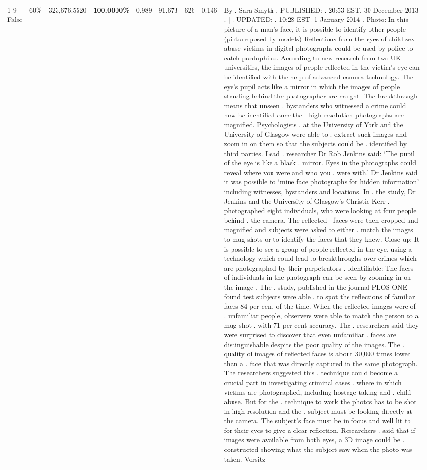 \begin{table}[H]
\begin{tabular}{lllrlllll}
\cline{1-9} \cline{2-9}
False & 60\% & 323,676.5520 & \bfseries \color{red} 100.0000\% & 0.989 & 91.673 & 626 & 0.146 & By . Sara Smyth . PUBLISHED: . 20:53 EST, 30 December 2013 . | . UPDATED: . 10:28 EST, 1 January 2014 . Photo: In this picture of a man's face, it is possible to identify other people (picture posed by models) Reflections from the eyes of child sex abuse victims in digital photographs could be used by police to catch paedophiles. According to new research from two UK universities, the images of people reflected in the victim's eye can be identified with the help of advanced camera technology. The eye's pupil acts like a mirror in which the images of people standing behind the photographer are caught. The breakthrough means that unseen . bystanders who witnessed a crime could now be identified once the . high-resolution photographs are magnified. Psychologists . at the University of York and the University of Glasgow were able to . extract such images and zoom in on them so that the subjects could be . identified by third parties. Lead . researcher Dr Rob Jenkins said: ‘The pupil of the eye is like a black . mirror. Eyes in the photographs could reveal where you were and who you . were with.' Dr Jenkins said it was possible to ‘mine face photographs for hidden information' including witnesses, bystanders and locations. In . the study, Dr Jenkins and the University of Glasgow's Christie Kerr . photographed eight individuals, who were looking at four people behind . the camera. The reflected . faces were then cropped and magnified and subjects were asked to either . match the images to mug shots or to identify the faces that they knew. Close-up: It is possible to see a group of people reflected in the eye, using a technology which could lead to breakthroughs over crimes which are photographed by their perpetrators . Identifiable: The faces of individuals in the photograph can be seen by zooming in on the image . The . study, published in the journal PLOS ONE, found test subjects were able . to spot the reflections of familiar faces 84 per cent of the time. When the reflected images were of . unfamiliar people, observers were able to match the person to a mug shot . with 71 per cent accuracy. The . researchers said they were surprised to discover that even unfamiliar . faces are distinguishable despite the poor quality of the images. The . quality of images of reflected faces is about 30,000 times lower than a . face that was directly captured in the same photograph. The researchers suggested this . technique could become a crucial part in investigating criminal cases . where in which victims are photographed, including hostage-taking and . child abuse. But for the . technique to work the photos has to be shot in high-resolution and the . subject must be looking directly at the camera. The subject's face must be in focus and well lit to for their eyes to give a clear reflection. Researchers . said that if images were available from both eyes, a 3D image could be . constructed showing what the subject saw when the photo was taken. Vorsitz \\

\end{tabular}
\end{table}
